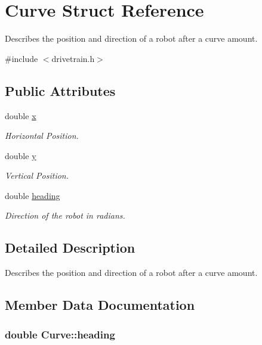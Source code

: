 \hypertarget{structCurve}{}\section{Curve Struct Reference}
\label{structCurve}


Describes the position and direction of a robot after a curve amount.  




{\ttfamily \#include $<$drivetrain.\+h$>$}

\subsection*{Public Attributes}
\begin{DoxyCompactItemize}
\item 
double \hyperlink{structCurve_a5d3af6bf8552bed573d4f3a1eeb70bd5}{x}
\begin{DoxyCompactList}\small\item\em Horizontal Position. \end{DoxyCompactList}\item 
double \hyperlink{structCurve_aabe742a202fc35bf2d30d24de017f62b}{y}
\begin{DoxyCompactList}\small\item\em Vertical Position. \end{DoxyCompactList}\item 
double \hyperlink{structCurve_a50248857e72a7f0dbfe1cdb55d2aca96}{heading}
\begin{DoxyCompactList}\small\item\em Direction of the robot in radians. \end{DoxyCompactList}\end{DoxyCompactItemize}


\subsection{Detailed Description}
Describes the position and direction of a robot after a curve amount. 

\subsection{Member Data Documentation}
\subsubsection[{\texorpdfstring{heading}{heading}}]{\setlength{\rightskip}{0pt plus 5cm}double Curve\+::heading}\hypertarget{structCurve_a50248857e72a7f0dbfe1cdb55d2aca96}{}\label{structCurve_a50248857e72a7f0dbfe1cdb55d2aca96}



